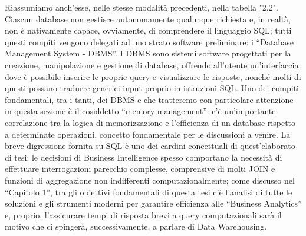 \documentclass[a4paper,12pt]{report}
\begin{document}
Riassumiamo anch’esse, nelle stesse modalità precedenti, nella tabella "2.2".
Ciascun database non gestisce autonomamente qualunque richiesta e, in realtà, non è nativamente capace, ovviamente, di comprendere il linguaggio SQL; tutti questi compiti vengono delegati ad uno strato software preliminare: i “Database Management System - DBMS”. I DBMS sono sistemi software progettati per la creazione, manipolazione e gestione di database, offrendo all’utente un’interfaccia dove è possibile inserire le proprie query e visualizzare le risposte, nonché molti di questi possano tradurre generici input proprio in istruzioni SQL. Uno dei compiti fondamentali, tra i tanti, dei DBMS e che tratteremo con particolare attenzione in questa sezione è il cosiddetto “memory management”: c’è un’importante correlazione tra la logica di memorizzazione e l’efficienza di un database rispetto a determinate operazioni, concetto fondamentale per le discussioni a venire. La breve digressione fornita su SQL è uno dei cardini concettuali di quest’elaborato di tesi: le decisioni di Business Intelligence spesso comportano la necessità di effettuare interrogazioni parecchio complesse, comprensive di molti JOIN e funzioni di aggregazione non indifferenti computazionalmente; come discusso nel “Capitolo 1”, tra gli obiettivi fondamentali di questa tesi c’è l’analisi di tutte le soluzioni e gli strumenti moderni per garantire efficienza alle “Business Analytics” e, proprio, l’assicurare tempi di risposta brevi a query computazionali sarà il motivo che ci spingerà, successivamente, a parlare di Data Warehousing.

\begin{table}[ht]
    \centering
    \caption{Funzioni di Aggregazione SQL}
    \label{tab:istruzioniSQL}
\end{table}
\end{document}
